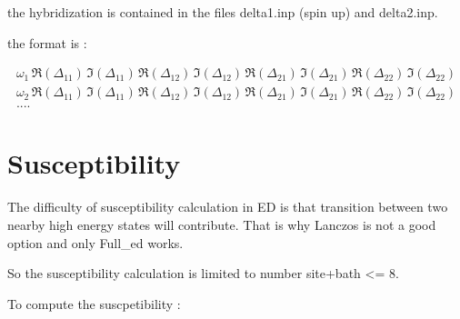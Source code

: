 \documentclass{book}
\def\D{\Delta}
\def\w{\omega}
\begin{document}
the hybridization is contained in the files delta1.inp (spin up) and delta2.inp.

the format is :

\begin{align}
  \w_1 \, \Re(\D_{11}) \,  \Im(\D_{11})\,  \Re(\D_{12}) \, \Im(\D_{12})\,  \Re(\D_{21}) \, \Im(\D_{21}) \, \Re(\D_{22}) \, \Im(\D_{22}) \nonumber\\
  \w_2 \, \Re(\D_{11}) \,  \Im(\D_{11})\,  \Re(\D_{12}) \, \Im(\D_{12})\,  \Re(\D_{21}) \, \Im(\D_{21}) \, \Re(\D_{22}) \, \Im(\D_{22}) \nonumber\\
  .... \nonumber
\end{align}




\section{Susceptibility}


The difficulty of susceptibility calculation in ED is that transition between two nearby high energy states  will contribute. That is why Lanczos is not a good option and only Full\_ed works.

So the susceptibility calculation is limited to number site+bath <= 8.

To compute the suscpetibility :
\end{document}
